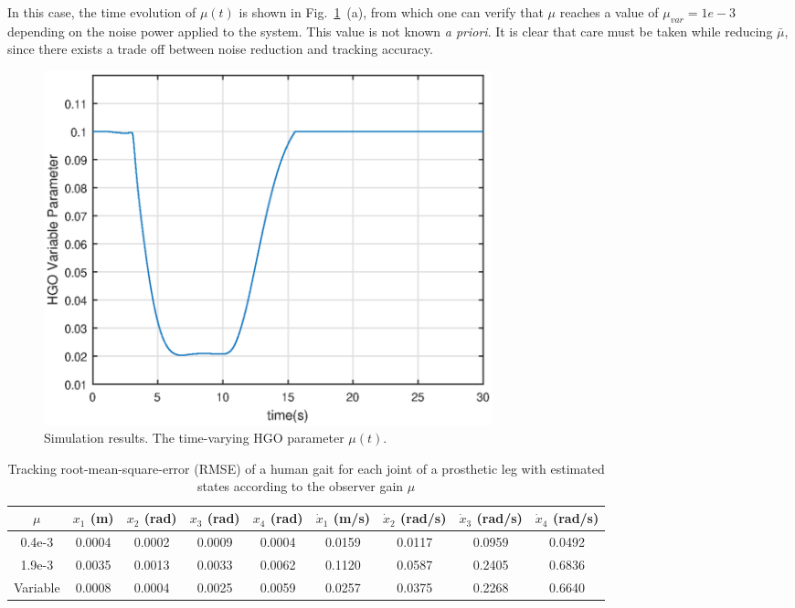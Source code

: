 \documentclass[letterpaper, 10 pt, journal, twocolumn]{IEEEtran}  %
\theoremstyle{plain}
\theoremstyle{definition}
\theoremstyle{remark}
\begin{document}
%
In this case, the time
evolution of $\mu(t)$ is shown in Fig.~\ref{fig:timevarying4}~(a), from which one can verify
that $\mu$ reaches a value of $\mu_{var}=1e-3$ depending on the noise power applied  to the system. 
This value is not known {\em a priori}. It is clear that care must be taken while reducing $\bar{\mu}$, since there exists a trade off
between noise reduction and tracking accuracy.
%
%
\begin{figure}[h!]
\begin{center}
\includegraphics[width = 13cm]{Figs/mu.eps}
\caption{Simulation results. The time-varying HGO parameter $\mu(t)$.}
\label{fig:timevarying4}
\end{center}
\end{figure}
%

\begin{table}[]
	\centering
	\caption{Tracking root-mean-square-error (RMSE) of a human gait for each joint of a prosthetic leg with estimated states according to the observer gain $\mu$}
	\begin{tabular}{ccccccccc}
	\hline
	$\mu$      & $x_1$ (m) & $x_2$ (rad) & $x_3$ (rad) & $x_4$ (rad) & $\dot{x}_1$ (m/s) & $\dot{x}_2$ (rad/s) & $\dot{x}_3$ (rad/s) & $\dot{x}_4$ (rad/s) \\ \hline
	0.4e-3   & 0.0004 & 0.0002 & 0.0009  & 0.0004  & 0.0159  & 0.0117    &  0.0959   &  0.0492   \\
	1.9e-3   & 0.0035 & 0.0013 & 0.0033  & 0.0062  & 0.1120  & 0.0587    &  0.2405   &  0.6836   \\
	Variable & 0.0008 & 0.0004 & 0.0025  & 0.0059  & 0.0257  & 0.0375    &  0.2268   &  0.6640
	\end{tabular}
	\label{table:RMSE_track}
\end{table}
\end{document}
